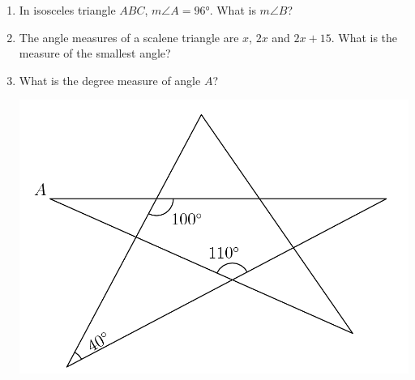 \documentclass{article}
\begin{document}
\begin{enumerate}[resume]
    \item In isosceles triangle $ABC$, $m\angle A = \ang{96}$.
        What is $m\angle B$?
        \vspace{3cm}
    \item The angle measures of a scalene triangle are $x$, $2x$ and $2x + 15$.
        What is the measure of the smallest angle?
        \vspace{3cm}
    \item What is the degree measure of angle $A$?
        \begin{center}
            \includegraphics[scale=0.15]{star.png}
        \end{center}
        \vspace{3cm}
\end{enumerate}
\end{document}
